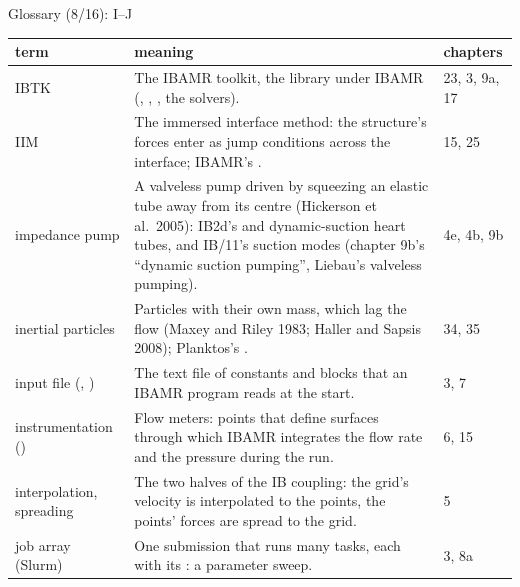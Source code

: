\documentclass[aspectratio=169,11pt]{beamer}
\makeatletter
\newenvironment{glossarytable}{\scriptsize\renewcommand{\arraystretch}{1.08}%
  \begin{tabular}{@{}L{0.19\textwidth}L{0.63\textwidth}L{0.12\textwidth}@{}}\toprule
  term & meaning & chapters\\\midrule}{\bottomrule\end{tabular}}
\makeatother
\begin{document}
\begin{frame}{Glossary (8/16): I--J}
\label{fr:g8}
\begin{glossarytable}
IBTK & The IBAMR toolkit, the library under IBAMR (, , , the solvers). & 23, 3, 9a, 17\\
IIM & The immersed interface method: the structure's forces enter as jump conditions across the interface; IBAMR's . & 15, 25\\
impedance pump & A valveless pump driven by squeezing an elastic tube away from its centre (Hickerson et al.\ 2005): IB2d's  and dynamic-suction heart tubes, and IB/11's suction modes (chapter 9b's ``dynamic suction pumping'', Liebau's valveless pumping). & 4e, 4b, 9b\\
inertial particles & Particles with their own mass, which lag the flow (Maxey and Riley 1983; Haller and Sapsis 2008); Planktos's . & 34, 35\\
input file (, ) & The text file of constants and blocks that an IBAMR program reads at the start. & 3, 7\\
instrumentation () & Flow meters: points that define surfaces through which IBAMR integrates the flow rate and the pressure during the run. & 6, 15\\
interpolation, spreading & The two halves of the IB coupling: the grid's velocity is interpolated to the points, the points' forces are spread to the grid. & 5\\
job array (Slurm) & One  submission that runs many tasks, each with its : a parameter sweep. & 3, 8a\\
\end{glossarytable}
\end{frame}
\end{document}
